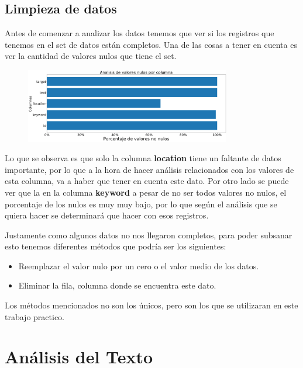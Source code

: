 \documentclass[titlepage,a4paper]{article}
\begin{document}
\subsection{\Large Limpieza de datos}
{\Large Antes de comenzar a analizar los datos tenemos que ver si los registros que tenemos en el set de datos están completos. Una de las cosas a tener en cuenta es ver la cantidad de valores nulos que tiene el set.
\par}
\begin{figure}[H]
 \centering
 \includegraphics[width=0.8\textwidth, height=0.8\textheight, keepaspectratio]{graficos/porcentajevaloresnonuloscolumnas.png}
\end{figure}
{\Large Lo que se observa es que solo la columna \textbf{location} tiene un faltante de datos importante, por lo que a la hora de hacer análisis relacionados con los valores de esta columna, va a haber que tener en cuenta este dato. Por otro lado se puede ver que la en la columna \textbf{keyword} a pesar de no ser todos valores no nulos, el porcentaje de los nulos es muy muy bajo, por lo que según el análisis que se quiera hacer se determinará que hacer con esos registros.
\par}
{\Large
Justamente como algunos datos no nos llegaron completos, para poder subsanar esto tenemos diferentes métodos que podría ser los siguientes:
\begin{itemize}
    \item Reemplazar el valor nulo por un cero o el valor medio de los datos.
    \item Eliminar la fila, columna donde se encuentra este dato.
\end{itemize}
Los métodos mencionados no son los únicos, pero son los que se utilizaran en este trabajo practico.
\par}
\newpage
\section{\Large Análisis del Texto}
\end{document}
